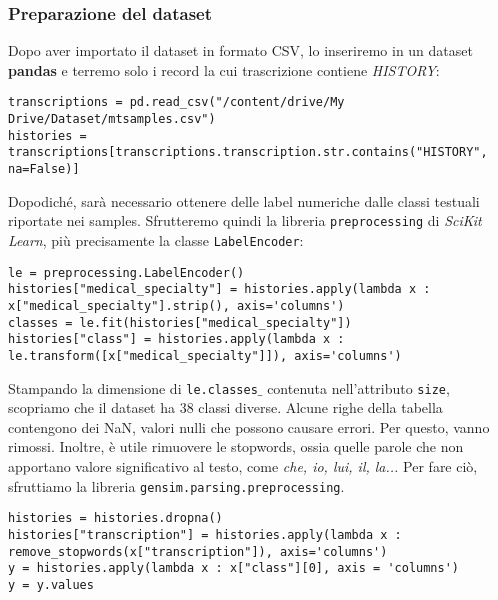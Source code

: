 \subsubsection{Preparazione del dataset}
Dopo aver importato il dataset in formato CSV, lo inseriremo in un dataset \textbf{pandas} e terremo solo i record la cui trascrizione contiene \textit{HISTORY}:
\begin{verbatim}
transcriptions = pd.read_csv("/content/drive/My Drive/Dataset/mtsamples.csv")
histories = transcriptions[transcriptions.transcription.str.contains("HISTORY", na=False)]
\end{verbatim}
Dopodiché, sarà necessario ottenere delle label numeriche dalle classi testuali riportate nei samples. Sfrutteremo quindi la libreria \texttt{preprocessing} di \textit{SciKit Learn}, più precisamente la classe \texttt{LabelEncoder}:
\begin{verbatim}
le = preprocessing.LabelEncoder()
histories["medical_specialty"] = histories.apply(lambda x : x["medical_specialty"].strip(), axis='columns')
classes = le.fit(histories["medical_specialty"])
histories["class"] = histories.apply(lambda x : le.transform([x["medical_specialty"]]), axis='columns')
\end{verbatim}
Stampando la dimensione di \texttt{le.classes$\_$} contenuta nell'attributo \texttt{size}, scopriamo che il dataset ha 38 classi diverse.
Alcune righe della tabella contengono dei NaN, valori nulli che possono causare errori. Per questo, vanno rimossi. Inoltre, è utile rimuovere le stopwords, ossia quelle parole che non apportano valore significativo al testo, come \textit{che, io, lui, il, la...} Per fare ciò, sfruttiamo la libreria \texttt{gensim.parsing.preprocessing}.
\begin{verbatim}
histories = histories.dropna()
histories["transcription"] = histories.apply(lambda x : remove_stopwords(x["transcription"]), axis='columns')
y = histories.apply(lambda x : x["class"][0], axis = 'columns')
y = y.values
\end{verbatim}
